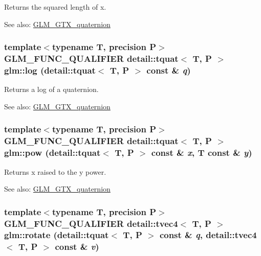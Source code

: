 Returns the squared length of x.

\begin{Desc}
\item[See also:]\hyperlink{group__gtx__quaternion}{GLM\_\-GTX\_\-quaternion} \end{Desc}
\hypertarget{group__gtx__quaternion_gbed81c73a777fce84fe442bbc17c13ce}{
\subsubsection[log]{\setlength{\rightskip}{0pt plus 5cm}template$<$typename T, precision P$>$ GLM\_\-FUNC\_\-QUALIFIER detail::tquat$<$ T, P $>$ glm::log (detail::tquat$<$ T, P $>$ const \& {\em q})}}
\label{group__gtx__quaternion_gbed81c73a777fce84fe442bbc17c13ce}


Returns a log of a quaternion.

\begin{Desc}
\item[See also:]\hyperlink{group__gtx__quaternion}{GLM\_\-GTX\_\-quaternion} \end{Desc}
\hypertarget{group__gtx__quaternion_g49e7cd8958d474290778760d171a44d2}{
\subsubsection[pow]{\setlength{\rightskip}{0pt plus 5cm}template$<$typename T, precision P$>$ GLM\_\-FUNC\_\-QUALIFIER detail::tquat$<$ T, P $>$ glm::pow (detail::tquat$<$ T, P $>$ const \& {\em x}, \/  T const \& {\em y})}}
\label{group__gtx__quaternion_g49e7cd8958d474290778760d171a44d2}


Returns x raised to the y power.

\begin{Desc}
\item[See also:]\hyperlink{group__gtx__quaternion}{GLM\_\-GTX\_\-quaternion} \end{Desc}
\hypertarget{group__gtx__quaternion_g9fd82cf89bc167ca12752f03a99329a4}{
\subsubsection[rotate]{\setlength{\rightskip}{0pt plus 5cm}template$<$typename T, precision P$>$ GLM\_\-FUNC\_\-QUALIFIER detail::tvec4$<$ T, P $>$ glm::rotate (detail::tquat$<$ T, P $>$ const \& {\em q}, \/  detail::tvec4$<$ T, P $>$ const \& {\em v})}}
\label{group__gtx__quaternion_g9fd82cf89bc167ca12752f03a99329a4}


